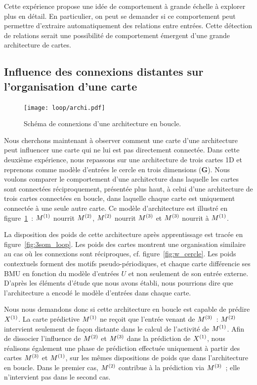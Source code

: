 \documentclass[../main]{subfiles}
\begin{document}
Cette expérience propose une idée de comportement à grande échelle à explorer plus en détail.
En particulier, on peut se demander si ce comportement peut permettre d'extraire automatiquement des relations entre entrées. Cette détection de relations serait une possibilité de comportement émergent d'une grande architecture de cartes.

\subsection{Influence des connexions distantes sur l'organisation d'une carte}
\begin{figure}
	\centering\texttt{[image: loop/archi.pdf]}
	\caption{Schéma de connexions d'une architecture en \og boucle\fg{}. \label{fig:archi_loop}}
\end{figure}

Nous cherchons maintenant à observer comment une carte d'une architecture peut influencer une carte qui ne lui est pas directement connectée.
Dans cette deuxième expérience, nous repassons sur une architecture de trois cartes 1D et reprenons comme modèle d'entrées le cercle en trois dimensions (\textbf{G}). 
Nous voulons comparer le comportement d'une architecture dans laquelle les cartes sont connectées réciproquement, présentée plus haut, à celui d'une architecture de trois cartes connectées en boucle, dans laquelle chaque carte est uniquement connectée à une seule autre carte. 
Ce modèle d'architecture est illustré en figure~\ref{fig:archi_loop}~: $M^{({1})}$ nourrit $M^{({2})}$, $M^{({2})}$ nourrit $M^{({3})}$ et $M^{({3})}$ nourrit à $M^{({1})}$.

La disposition des poids de cette architecture après apprentissage est tracée en figure~\ref{fig:3som_loop}.
Les poids des cartes montrent une organisation similaire au cas où les connexions sont réciproques, cf. figure~\ref{fig:w_cercle}. Les poids contextuels forment des motifs pseudo-périodiques, et chaque carte différencie ses BMU en fonction du modèle d'entrées $U$ et non seulement de son entrée externe.
D'après les éléments d'étude que nous avons établi, nous pourrions dire que l'architecture a encodé le modèle d'entrées dans chaque carte.

Nous nous demandons donc si cette architecture en boucle est capable de prédire $X^{({1})}$. 
La carte prédictive $M^{({1})}$ ne reçoit que l'entrée venant de $M^{({3})}$~: $M^{({2})}$ intervient seulement de façon distante dans le calcul de l'activité de $M^{({1})}$.
Afin de dissocier l'influence de $M^{({2})}$ et $M^{({3})}$ dans la prédiction de $X^{({1})}$, nous réalisons également une phase de prédiction effectuée uniquement à partir des cartes $M^{({3})}$ et $M^{({1})}$, sur les mêmes dispositions de poids que dans l'architecture en boucle. 
Dans le premier cas, $M^{({2})}$ contribue à la prédiction via $M^{({3})}$~; elle n'intervient pas dans le second cas.
\end{document}
